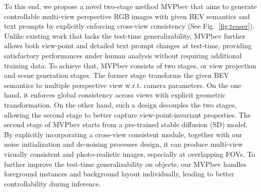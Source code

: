 To this end, we propose a novel two-stage method MVPbev that aims to generate controllable multi-view perspective RGB images with given BEV semantics and text prompts by explicitly enforcing cross-view consistency (See Fig.~\ref{fig:teaser}). Unlike existing work that lacks the test-time generalizability, MVPbev further allows both view-point and detailed text prompt changes at test-time, providing satisfactory performances under human analysis without requiring additional training data. To achieve that, MVPbev consists of two stages, or view projection and scene generation stages. The former stage transforms the given BEV semantics to multiple perspective view w.r.t. camera parameters. On the one hand, it enforces global consistency across views with explicit geometric transformation. On the other hand, such a design decouples the two stages, allowing the second stage to better capture view-point-invariant properties. The second stage of MVPbev starts from a pre-trained stable diffusion (SD) model. By explicitly incorporating a cross-view consistent module, together with our noise initialization and de-noising processes design, it can produce multi-view visually consistent and photo-realistic images, especially at overlapping FOVs. To further improve the test-time generalizability on objects, our MVPbev handles foreground instances and background layout individually, leading to better controllability during inference.

